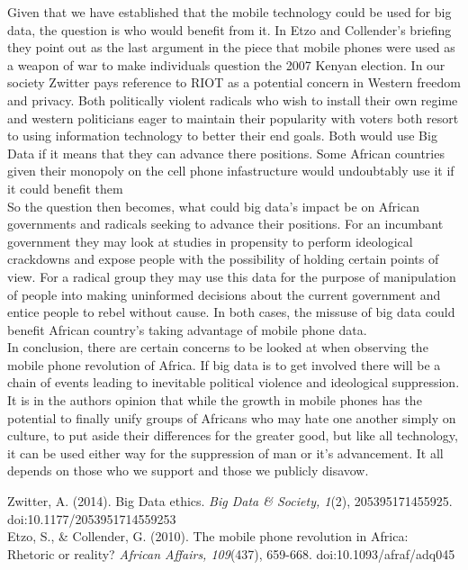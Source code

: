 \documentclass[fleqn, 12pt,letterpaper]{article}
\begin{document}
\hspace*{10mm} Given that we have established that the mobile technology could be used for big data, the question is who would benefit from it. In Etzo and Collender's briefing they point out as the last argument in the piece that mobile phones were used as a weapon of war to make individuals question the 2007 Kenyan election. In our society Zwitter pays reference to RIOT as a potential concern in Western freedom and privacy. Both politically violent radicals who wish to install their own regime and western politicians eager to maintain their popularity with voters both resort to using information technology to better their end goals. Both would use Big Data if it means that they can advance there positions. Some African countries given their monopoly on the cell phone infastructure would undoubtably use it if it could benefit them\\
\hspace*{10mm} So the question then becomes, what could big data's impact be on African governments and radicals seeking to advance their positions. For an incumbant government they may look at studies in propensity to perform ideological crackdowns and expose people with the possibility of holding certain points of view. For a radical group they may use this data for the purpose of manipulation of people into making uninformed decisions about the current government and entice people to rebel without cause. In both cases, the missuse of big data could benefit African country's taking advantage of mobile phone data.\\
\hspace*{10mm} In conclusion, there are certain concerns to be looked at when observing the mobile phone revolution of Africa. If big data is to get involved there will be a chain of events leading to inevitable political violence and ideological suppression. It is in the authors opinion that while the growth in mobile phones has the potential to finally unify groups of Africans who may hate one another simply on culture, to put aside their differences for the greater good, but like all technology, it can be used either way for the suppression of man or it's advancement. It all depends on those who we support and those we publicly disavow. 

	 \pagebreak
	
	
	
	
	
	Zwitter, A. (2014). Big Data ethics. \textit{Big Data \& Society, 1}(2),  205395171455925.\\ \hspace*{10mm} doi:10.1177/2053951714559253 \\
	Etzo, S., \& Collender, G. (2010). The mobile phone revolution in Africa: \\ \hspace*{10mm}Rhetoric or reality? \textit{ African Affairs, 109}(437), 659-668. doi:10.1093/afraf/adq045
	




	
\end{document}
